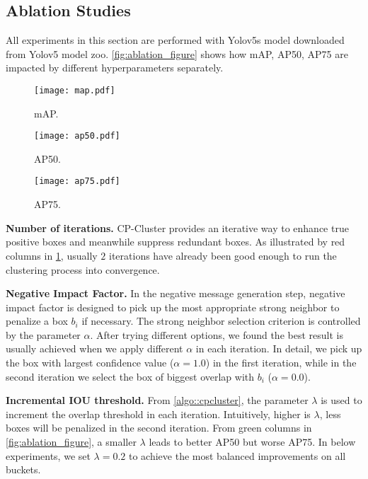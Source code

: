 \documentclass[10pt,twocolumn,letterpaper]{article}
\begin{document}
\subsection{Ablation Studies}
\label{sec:ablation}
All experiments in this section are performed with Yolov5s model downloaded from Yolov5 model zoo. \cref{fig:ablation_figure} shows how mAP, AP50, AP75 are impacted by different hyperparameters separately.
\begin{figure*}[h!]
  \begin{subfigure}{.33\textwidth}
    \centering
    \texttt{[image: map.pdf]}
    \caption{mAP.}
    \label{fig:ablation_map}
  \end{subfigure}
  \hfil
  \begin{subfigure}{.33\textwidth}
    \centering
    \texttt{[image: ap50.pdf]}
    \caption{AP50.}
    \label{fig:ablation_ap50}
  \end{subfigure}
  \hfil
  \begin{subfigure}{.33\textwidth}
    \centering
    \texttt{[image: ap75.pdf]}
    \caption{AP75.}
    \label{fig:ablation_ap75}
  \end{subfigure}
  \caption{Accuracies with different hyperparameters on Yolov5s.}
  \label{fig:ablation_figure}
\end{figure*}

\textbf{Number of iterations.} CP-Cluster provides an iterative way to enhance true positive boxes and meanwhile suppress redundant boxes.
As illustrated by red columns in \cref{fig:ablation_map}, usually $2$ iterations have already been good enough to run the clustering process into convergence.

\textbf{Negative Impact Factor.} In the negative message generation step, negative impact factor is designed to pick up the most appropriate strong neighbor to penalize a box $b_i$ if necessary.
The strong neighbor selection criterion is controlled by the parameter $\alpha$. After trying different options, we found the best result is usually achieved when we apply different $\alpha$ in each iteration.
In detail, we pick up the box with largest confidence value ($\alpha=1.0$) in the first iteration, while in the second iteration we select the box of biggest overlap with $b_i$ ($\alpha=0.0$).

\textbf{Incremental IOU threshold.} From \cref{algo::cpcluster}, the parameter $\lambda$ is used to increment the overlap threshold in each iteration. Intuitively, higher is $\lambda$, less boxes will be penalized in the second iteration.
From green columns in \cref{fig:ablation_figure}, a smaller $\lambda$ leads to better AP50 but worse AP75. In below experiments, we set $\lambda=0.2$ to achieve the most balanced improvements on all buckets.
\end{document}
